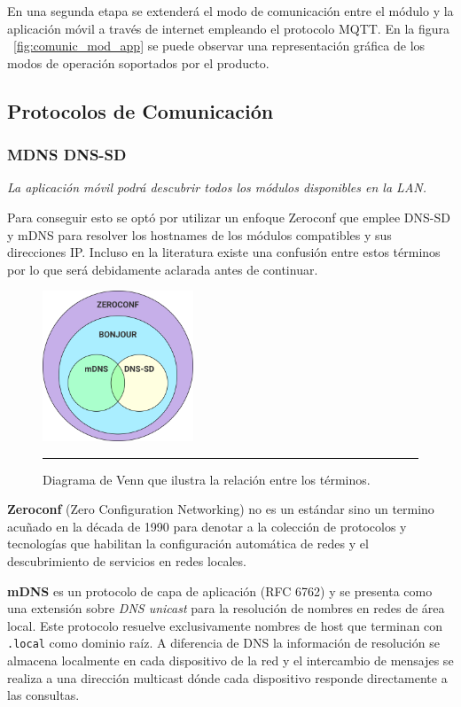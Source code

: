 En una segunda etapa se extenderá el modo de comunicación entre el módulo y la aplicación móvil a través de internet empleando el protocolo MQTT. En la figura ~\ref{fig:comunic_mod_app} se puede observar una representación gráfica de los modos de operación soportados por el producto.

\subsection{Protocolos de Comunicación}
\subsubsection{MDNS DNS-SD}
\emph{La aplicación móvil podrá descubrir todos los módulos disponibles en la LAN.}

Para conseguir esto se optó por utilizar un enfoque Zeroconf que emplee DNS-SD y mDNS para resolver los hostnames de los módulos compatibles y sus direcciones IP. Incluso en la literatura existe una confusión entre estos términos por lo que será debidamente aclarada antes de continuar.

\begin{figure}[htbp]
	\centering
	\includegraphics[width=0.4\textwidth]{Figures/design/zeroconf_venn.png}
	\rule{35em}{1pt}
	\caption[Connection Diagram]{Diagrama de Venn que ilustra la relación entre los términos.}
	\label{fig:zeroconf_venn}
\end{figure}

\textbf{Zeroconf} (Zero Configuration Networking) no es un estándar sino un termino acuñado en la década de 1990 para denotar a la colección de protocolos y tecnologías que habilitan la configuración automática de redes y el descubrimiento de servicios en redes locales.

\textbf{mDNS} es un protocolo de capa de aplicación (RFC 6762) y se presenta como una extensión sobre \emph{DNS unicast} para la resolución de nombres en redes de área local. Este protocolo resuelve exclusivamente nombres de host que terminan con \texttt{.local} como dominio raíz. A diferencia de DNS la información de resolución se almacena localmente en cada dispositivo de la red y el intercambio de mensajes se realiza a una dirección multicast dónde cada dispositivo responde directamente a las consultas. 

